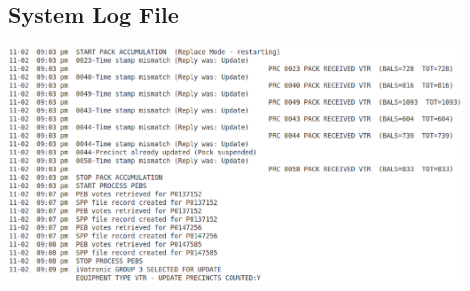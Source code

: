 \documentclass[letterpaper,twocolumn,10pt]{article}
\begin{document}
\begin{center}
\clearpage
\section{System Log File}\label{app:sl}
\includegraphics[width=0.9\textwidth]{system.eps}
\end{center}

\end{document}
